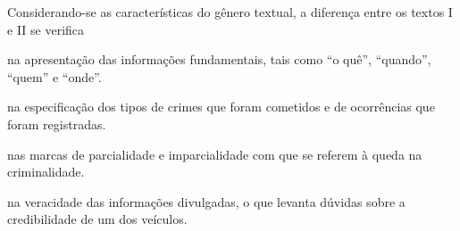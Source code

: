 Considerando-se as características do gênero textual, a diferença entre
os textos I e II se verifica

\begin{escolha}
\item na apresentação das informações fundamentais, tais como ``o quê'',
``quando'', ``quem'' e ``onde''.

\item na especificação dos tipos de crimes que foram cometidos e de
ocorrências que foram registradas.

\item nas marcas de parcialidade e imparcialidade com que se referem à
queda na criminalidade.

\item na veracidade das informações divulgadas, o que levanta dúvidas sobre
a credibilidade de um dos veículos.
\end{escolha}